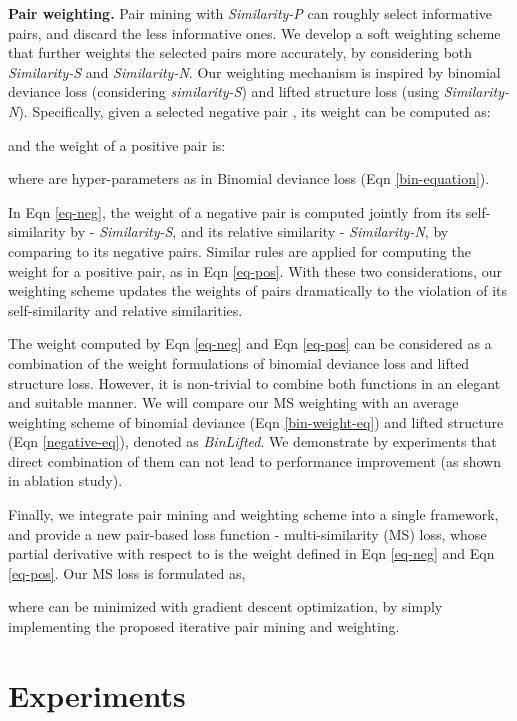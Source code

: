 \documentclass[10pt,twocolumn,letterpaper]{article}
\begin{document}
{\bf Pair weighting.}
Pair mining with \emph{Similarity-P} can roughly select informative pairs, and discard the less informative ones. We develop a {soft} weighting scheme that further weights the selected pairs more accurately, by considering both {\it Similarity-S} and {\it Similarity-N}. Our weighting mechanism is inspired by binomial deviance loss (considering {\it similarity-S}) and lifted structure loss (using {\it Similarity-N}). Specifically, given a selected negative pair , its weight  can be computed as:

and the weight  of a positive pair  is:

where  are hyper-parameters as in Binomial deviance loss (Eqn \ref{bin-equation}).

In Eqn \ref{eq-neg}, the weight of a negative pair is computed jointly from its self-similarity by  - {\it Similarity-S}, and its relative similarity - {\it Similarity-N}, by comparing to its negative pairs. Similar rules are applied for computing the weight for a positive pair, as in Eqn \ref{eq-pos}. With these two considerations, our weighting scheme updates the weights of pairs dramatically to the violation of its self-similarity and relative similarities. 

The weight computed by Eqn \ref{eq-neg} and Eqn \ref{eq-pos} can be considered as a combination of the weight formulations of binomial deviance loss and lifted structure loss. However, it is non-trivial to combine both functions in an elegant and suitable manner. 
We will compare our MS weighting with an average weighting scheme of binomial deviance (Eqn \ref{bin-weight-eq}) and lifted structure (Eqn \ref{negative-eq}), denoted as {\it BinLifted}. We demonstrate by experiments that direct combination of them can not lead to performance improvement (as shown in ablation study). 

Finally, we integrate pair mining and weighting scheme into a single framework, and provide a new pair-based loss function - multi-similarity (MS) loss, whose partial derivative with respect to  is the weight defined in Eqn \ref{eq-neg} and Eqn \ref{eq-pos}. Our MS loss is formulated as,

where  can be minimized with gradient descent optimization, by simply implementing the proposed iterative pair mining and weighting.


\section{Experiments}
\end{document}
